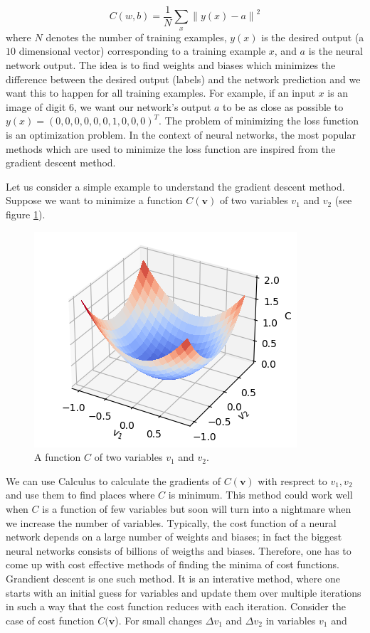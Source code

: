 $$C(w,b) = \frac{1}{N} \sum_x {\|y(x) - a\|}^2$$
where $N$ denotes the number of training examples, $y(x)$ is the desired output (a $10$ dimensional vector) corresponding to a training example $x$, and 
$a$ is the neural network output. The idea is to find weights and biases which minimizes the difference between the desired output (labels) and the network prediction and we want this to happen for all training examples. For example, 
if an input $x$ is an image of digit $6$, we want our network's output $a$ to be as close as possible to $y(x) = (0,0,0,0,0,0,1,0,0,0)^T$. The problem of 
minimizing the loss function is an optimization problem. In the context of neural networks, the most popular methods which are used to minimize the loss function are 
inspired from the gradient descent method. 

Let us consider a simple example to understand the gradient descent method. Suppose we want to minimize a function $C(\mathbf{v})$ of two variables $v_1$ and $v_2$ (see figure \ref{fig:cost_f}).
\begin{figure}[htbp]
    \centering
    \includegraphics[width=.4\textwidth]{Figures/cost_func.png}
    \caption{A function $C$ of two variables $v_1$ and $v_2$.}
    \label{fig:cost_f}
\end{figure} 
We can use Calculus to calculate the gradients of $C(\mathbf{v})$ with resprect to $v_1, v_2$ and use them to find places where $C$ is minimum. This method could work well when 
$C$ is a function of few variables but soon will turn into a nightmare when we increase the number of variables. Typically, the cost function of a neural network depends on a large number of
weights and biases; in fact the biggest neural networks consists of billions of weigths and biases. Therefore, one has to come up with cost effective 
methods of finding the minima of cost functions. Grandient descent is one such method. It is an interative method, where one starts 
with an initial guess for variables and update them over multiple iterations in such a 
way that the cost function reduces with each iteration. Consider the case of cost function $C(\mathbf{v}$). For small changes $\Delta v_1$ and  $\Delta v_2$ in variables $v_1$ and 
